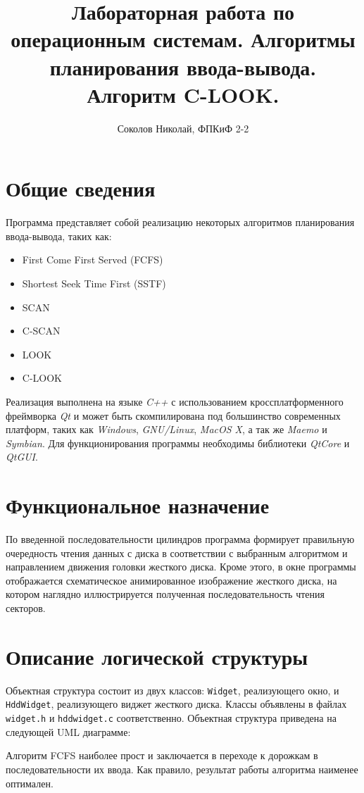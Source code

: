 \documentclass[a4paper,10pt,oneside]{article}
\author{Соколов Николай, ФПКиФ 2-2}
\title{Лабораторная работа по операционным\nolinebreak{} системам. \linebreak
Алгоритмы планирования ввода-вывода. Алгоритм C-LOOK.}
\date{}
\begin{document}
\maketitle

\section{Общие сведения}
Программа представляет собой реализацию некоторых алгоритмов планирования ввода-вывода, таких как:
\begin{itemize}
 \item First Come First Served (FCFS)
 \item Shortest Seek Time First (SSTF)
 \item SCAN
 \item C-SCAN
 \item LOOK
 \item C-LOOK
\end{itemize}
Реализация выполнена на языке \textit{C++} с использованием кроссплатформенного фреймворка \textit{Qt} и может быть скомпилирована под большинство
современных платформ, таких как \textit{Windows}, \textit{GNU/Linux}, \textit{MacOS X}, а так же \textit{Maemo} и \textit{Symbian}. 
Для функционирования программы необходимы библиотеки \textit{QtCore} и \textit{QtGUI}.

\section{Функциональное назначение}
По введенной последовательности цилиндров программа формирует правильную очередность чтения данных с диска в соответствии с выбранным алгоритмом
и направлением движения головки жесткого диска. Кроме этого, в окне программы отображается схематическое анимированное изображение жесткого диска,
на котором наглядно иллюстрируется полученная последовательность чтения секторов.

\section{Описание логической структуры}
Объектная структура состоит из двух классов: \texttt{Widget}, реализующего окно, и \texttt{HddWidget}, реализующего виджет жесткого диска. Классы объявлены в файлах
\texttt{widget.h} и \texttt{hddwidget.c} соответственно. Объектная структура приведена на следующей UML диаграмме:



Алгоритм FCFS наиболее прост и заключается в переходе к дорожкам в последовательности их ввода. Как правило, результат работы алгоритма наименее оптимален.
\end{document}
